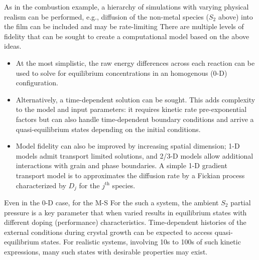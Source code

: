 \documentclass[11pt]{article}
\begin{document}
As in the combustion example, a hierarchy of simulations with varying
physical realism can be performed, e.g., diffusion of the non-metal
species ($S_2$ above) into the film can be included and may be
rate-limiting There are multiple levels of fidelity that can be
sought to create a computational model based on the above ideas.
\begin{itemize}
\item At the most simplistic, the raw energy differences across each
  reaction can be used to solve for equilibrium concentrations in an
  homogenous (0-D) configuration.
\item Alternatively, a time-dependent solution can be sought. This
  adds complexity to the model and input parameters: it requires kinetic
  rate pre-exponential factors but can also handle time-dependent
  boundary conditions and arrive a quasi-equilibrium states depending
  on the initial conditions.
\item Model fidelity can also be improved by increasing spatial
  dimension; 1-D models admit transport limited solutions, and 2/3-D
  models allow additional interactions with grain and phase
  boundaries. A simple 1-D gradient transport model is to approximates the
  diffusion rate by a Fickian process characterized by $D_j$ for the
  $j^\mathrm{th}$ species. 
\end{itemize}

Even in the 0-D case, for the M-S For the such a system, the ambient
$S_2$ partial pressure is a key parameter that when varied results in
equilibrium states with different doping (performance)
characteristics. Time-dependent histories of the external conditions
during crystal growth can be expected to access quasi-equilibrium
states. For realistic systems, involving 10s to 100s of such kinetic
expressions, many such states with desirable properties may exist.
\end{document}
